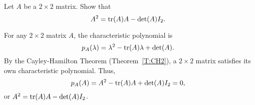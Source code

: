 \documentclass{ximera}
\begin{document}
\begin{exercise}  \label{c6.CH}
Let $A$ be a $2\times 2$ matrix.  Show that
\[
A^2 = {\rm tr}(A)A-\det(A)I_2.
\]

\begin{solution}
For any $2 \times 2$ matrix $A$, the characteristic
polynomial is
\[
p_A(\lambda) = \lambda^2 - {\rm tr}(A)\lambda + \det(A).
\]
By the Cayley-Hamilton Theorem (Theorem~\ref{T:CH2}), a $2 \times 2$
matrix satisfies its own characteristic polynomial.  Thus,
\[
p_A(A) = A^2 - {\rm tr}(A)A + \det(A)I_2 = 0,
\]
or $A^2 = {\rm tr}(A)A - \det(A)I_2$.



\end{solution}
\end{exercise}
\end{document}
